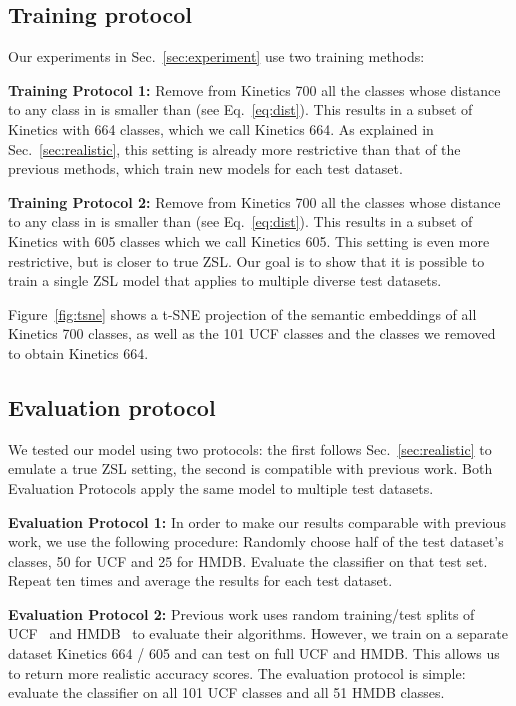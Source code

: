 \documentclass[10pt,twocolumn,letterpaper]{article}
\begin{document}
\subsection{Training protocol}
\label{sec:training_protocol}
Our experiments in Sec.~\ref{sec:experiment} use two training methods:



\textbf{Training Protocol 1:} Remove from Kinetics 700 all the classes whose distance to any class in  is smaller than  (see Eq.~\ref{eq:dist}). This results in a subset of Kinetics with 664 classes, which we call Kinetics 664. As explained in Sec.~\ref{sec:realistic}, this setting is already more restrictive than that of the previous methods, which train new models for each test dataset.

\textbf{Training Protocol 2:} Remove from Kinetics 700 all the classes whose distance to any class in  is smaller than  (see Eq.~\ref{eq:dist}). This results in a subset of Kinetics with 605 classes which we call Kinetics 605. This setting is even more restrictive, but is closer to true ZSL. Our goal is to show that it is possible to train a single ZSL model that applies to multiple diverse test datasets.


Figure~\ref{fig:tsne} shows a t-SNE projection of the semantic embeddings of all Kinetics 700 classes, as well as the 101 UCF classes and the classes we removed to obtain Kinetics 664. 

\subsection{Evaluation protocol}
\label{sec:eval_protocol}
We tested our model using two protocols: the first follows Sec.~\ref{sec:realistic} to emulate a true ZSL setting, the second is compatible with previous work. Both Evaluation Protocols apply the same model to multiple test datasets.

\textbf{Evaluation Protocol 1:} 
In order to make our results comparable with previous work, we use the following procedure: Randomly choose half of the test dataset's classes, 50 for UCF and 25 for HMDB. Evaluate the classifier on that test set. Repeat ten times and average the results for each test dataset.

\textbf{Evaluation Protocol 2:} Previous work uses random training/test splits of UCF~\cite{ucf} and HMDB~\cite{hmdb} to evaluate their algorithms. However, we train on a separate dataset Kinetics 664 / 605 and can test on full UCF and HMDB. This allows us to return more realistic accuracy scores. The evaluation protocol is simple: evaluate the classifier on all 101 UCF classes and all 51 HMDB classes.
\end{document}
